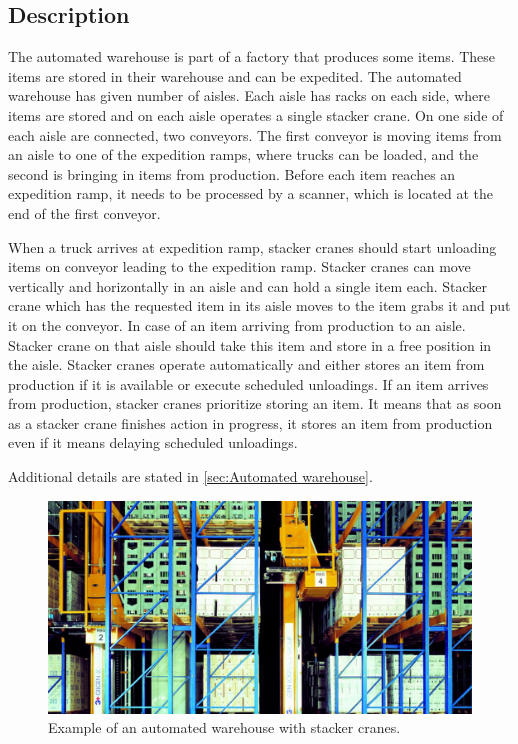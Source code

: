 \documentclass{ctuthesis}
\begin{document}
\subsection{Description}
\label{subsec:Description}
The automated warehouse is part of a factory that produces some items. These items are stored in their warehouse and can be expedited. The automated warehouse has given number of aisles. Each aisle has racks on each side, where items are stored and on each aisle operates a single stacker crane. On one side of each aisle are connected, two conveyors. The first conveyor is moving items from an aisle to one of the expedition ramps, where trucks can be loaded, and the second is bringing in items from production. Before each item reaches an expedition ramp, it needs to be processed by a scanner, which is located at the end of the first conveyor.

When a truck arrives at expedition ramp, stacker cranes should start unloading items on conveyor leading to the expedition ramp. Stacker cranes can move vertically and horizontally in an aisle and can hold a single item each. Stacker crane which has the requested item in its aisle moves to the item grabs it and put it on the conveyor. In case of an item arriving from production to an aisle. Stacker crane on that aisle should take this item and store in a free position in the aisle. Stacker cranes operate automatically and either stores an item from production if it is available or execute scheduled unloadings. If an item arrives from production, stacker cranes prioritize storing an item. It means that as soon as a stacker crane finishes action in progress, it stores an item from production even if it means delaying scheduled unloadings.

Additional details are stated in \ref{sec:Automated warehouse}.

\begin{figure}
\includegraphics[width=0.8\linewidth]{highbaywarehouse.jpg}
\caption{Example of an automated warehouse with stacker cranes. \cite{warehousepic}}
\label{fig:foobar}
\end{figure}
\end{document}
